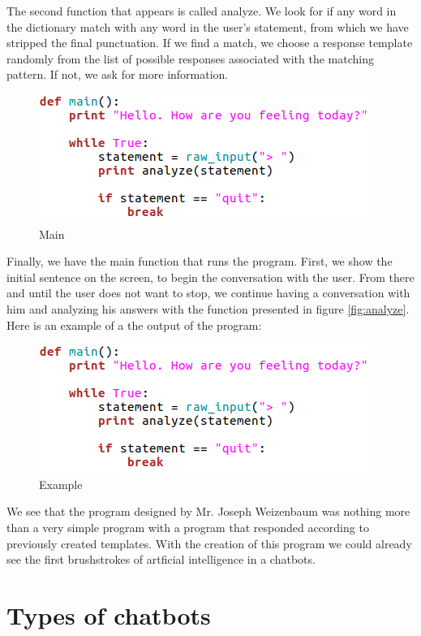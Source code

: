 \documentclass[12pt,twoside]{article}
\theoremstyle{plain}
\theoremstyle{definition}
\theoremstyle{remark}
\begin{document}
The second function that appears is called analyze. We look for if any word in the dictionary match with any word in the user's statement, from which we have stripped the final punctuation. If we find a match, we choose a response template randomly from the list of possible responses associated with the matching pattern. If not, we ask for more information.
\begin{figure}[h]
\centering
\includegraphics[scale=0.6]{./Pictures/main.png}
\caption{Main}
\label{fig:main}
\end{figure}
Finally, we have the main function that runs the program. First, we show the initial sentence on the screen, to begin the conversation with the user. From there and until the user does not want to stop, we continue having a conversation with him and analyzing his answers with the function presented in figure \ref{fig:analyze}.\\

Here is an example of a the output of the program:



\begin{figure}[h]
\centering
\includegraphics[scale=0.6]{./Pictures/main.png}
\caption{Example}
\end{figure}

We see that the program designed by Mr. Joseph Weizenbaum was nothing more than a very simple program with a program that responded according to previously created templates. With the creation of this program we could already see the first brushstrokes of artficial intelligence in a chatbots.
 



\section{Types of chatbots}
\label{sec:types}
\end{document}
